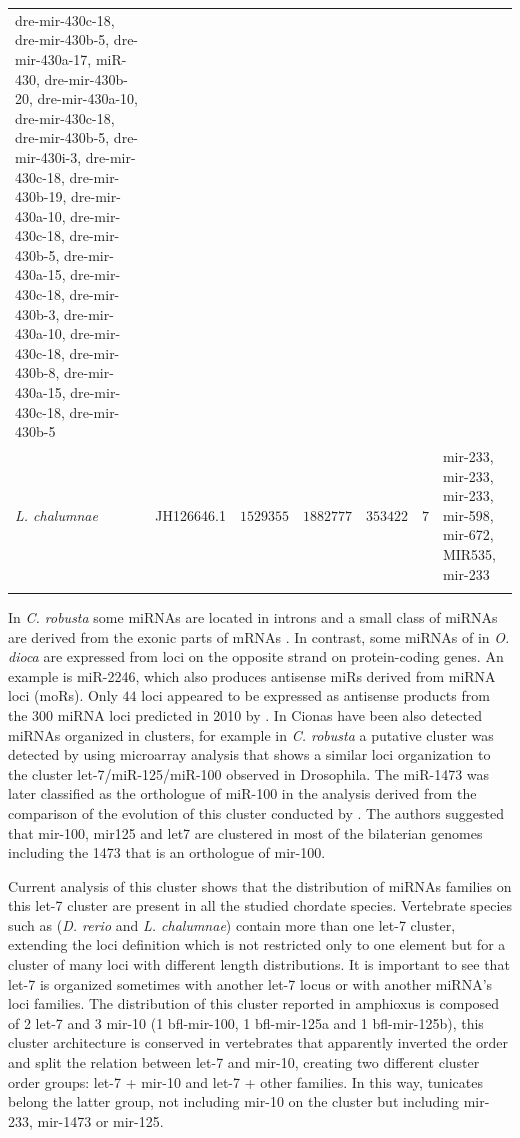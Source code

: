 \documentclass[graybox]{svmult}
\let\cite \citep
\begin{document}
\begin{small}
\begin{center}
\begin{longtable}{p{2.0 cm}p{2 cm}p{2 cm}p{2 cm}p{1.2 cm}p{1.0 cm}p{2.6 cm}}
{dre-mir-430c-18, dre-mir-430b-5, dre-mir-430a-17, miR-430, dre-mir-430b-20, 
dre-mir-430a-10, dre-mir-430c-18, dre-mir-430b-5, dre-mir-430i-3, 
dre-mir-430c-18, dre-mir-430b-19, dre-mir-430a-10, dre-mir-430c-18, 
dre-mir-430b-5, dre-mir-430a-15, dre-mir-430c-18, dre-mir-430b-3, 
dre-mir-430a-10, dre-mir-430c-18, dre-mir-430b-8, dre-mir-430a-15, 
dre-mir-430c-18, dre-mir-430b-5} \\
\textit{L. chalumnae} & JH126646.1 & $1529355$ & $1882777$ & $353422$ & $7$ & 
mir-233, mir-233, mir-233, mir-598, mir-672, MIR535, mir-233 \\
\hline\noalign{\smallskip}
\end{longtable}
\end{center}
\end{small}
In \textit{C. robusta} some miRNAs are located in introns and a 
small class of miRNAs are derived from the exonic parts of mRNAs
\cite{Hendrix2010}. In contrast, some miRNAs of in \textit{O. dioca} are expressed from loci on the opposite strand on protein-coding genes. An example is miR-2246, which also produces antisense miRs derived from miRNA loci (moRs). Only $44$ loci appeared to be expressed as antisense products from the $300$ miRNA loci predicted in 2010 by \citet{Hendrix2010}. In Cionas have been also detected miRNAs organized in clusters, for example in \textit{C. robusta} a putative cluster was detected by \citet{Keshavan2010} using microarray analysis that shows a similar loci organization to the cluster let-7/miR-125/miR-100 observed in Drosophila. The miR-1473 was later classified as the orthologue of miR-100 in the analysis 
derived from the comparison of the evolution of this cluster conducted by 
\citet{Griffiths-Jones2011}. The authors suggested that mir-100, mir125 and let7 
are clustered in most of the bilaterian genomes including the 1473 that is an 
orthologue of mir-100. 

Current analysis of this cluster shows that the distribution of miRNAs families 
on this let-7 cluster are present in all the studied chordate species. 
Vertebrate species such as (\textit{D. rerio} and \textit{L. chalumnae}) 
contain more than one let-7 cluster, extending the loci definition which is not 
restricted only to one element but for a cluster of many loci with different 
length distributions. It is important to see that let-7 is organized sometimes 
with another let-7 locus or with another miRNA's loci families. The 
distribution of this cluster reported in amphioxus is composed of 2 let-7 and 3 
mir-10 (1 bfl-mir-100, 1 bfl-mir-125a and 1 bfl-mir-125b), this 
cluster architecture is conserved in vertebrates that apparently inverted 
the order and split the relation between let-7 and mir-10, creating two 
different cluster order groups: let-7 + mir-10 and let-7 + other families. 
In this way, tunicates belong the latter group, not including mir-10 on the 
cluster but including mir-233, mir-1473 or mir-125. 
\end{document}
